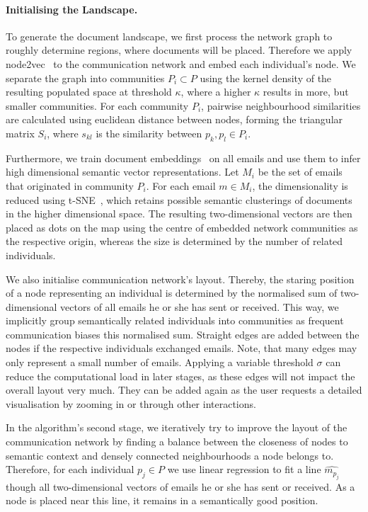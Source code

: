 \paragraph{Initialising the Landscape.}
To generate the document landscape, we first process the network graph to roughly determine regions, where documents will be placed.
Therefore we apply node2vec~\cite{grover2016node2vec} to the communication network and embed each individual's node.
We separate the graph into communities $P_i\subset P$ using the kernel density of the resulting populated space at threshold $\kappa$, where a higher $\kappa$ results in more, but smaller communities.
For each community $P_i$, pairwise neighbourhood similarities are calculated using euclidean distance between nodes, forming the triangular matrix $S_i$, where $s_{kl}$ is the similarity between $p_k,p_l\in P_i$.

Furthermore, we train document embeddings~\cite{le2014distributed,hu2017} on all emails and use them to infer high dimensional semantic vector representations.
Let $M_i$ be the set of emails that originated in community $P_i$.
For each email $m\in M_i$, the dimensionality is reduced using t-SNE~\cite{maaten2008visualizing}, which retains possible semantic clusterings of documents in the higher dimensional space.
The resulting two-dimensional vectors are then placed as dots on the map using the centre of embedded network communities as the respective origin, whereas the size is determined by the number of related individuals.

We also initialise communication network's layout.
Thereby, the staring position of a node representing an individual is determined by the normalised sum of two-dimensional vectors of all emails he or she has sent or received.
This way, we implicitly group semantically related individuals into communities as frequent communication biases this normalised sum.
Straight edges are added between the nodes if the respective individuals exchanged emails.
Note, that many edges may only represent a small number of emails.
Applying a variable threshold $\sigma$ can reduce the computational load in later stages, as these edges will not impact the overall layout very much.
They can be added again as the user requests a detailed visualisation by zooming in or through other interactions.

In the algorithm's second stage, we iteratively try to improve the layout of the communication network by finding a balance between the closeness of nodes to semantic context and densely connected neighbourhoods a node belongs to.
Therefore, for each individual $p_j\in P$ we use linear regression to fit a line $\widehat{m_{p_j}}$ though all two-dimensional vectors of emails he or she has sent or received.
As a node is placed near this line, it remains in a semantically good position.

